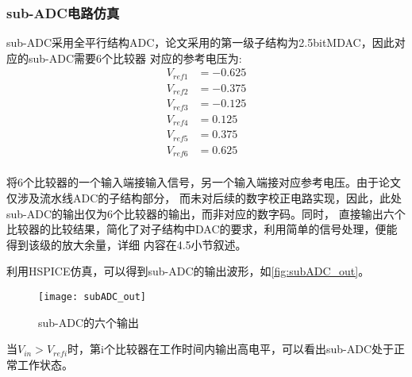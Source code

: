     \subsubsection{sub-ADC电路仿真}
    sub-ADC采用全平行结构ADC，论文采用的第一级子结构为2.5bitMDAC，因此对应的sub-ADC需要6个比较器
    对应的参考电压为:
    \begin{align*}
        V_{ref1} & = -0.625 \\
        V_{ref2} & = -0.375 \\
        V_{ref3} & = -0.125 \\
        V_{ref4} & = 0.125 \\
        V_{ref5} & = 0.375 \\
        V_{ref6} & = 0.625 \\
    \end{align*}
    \par 将6个比较器的一个输入端接输入信号，另一个输入端接对应参考电压。由于论文仅涉及流水线ADC的子结构部分，
    而未对后续的数字校正电路实现，因此，此处sub-ADC的输出仅为6个比较器的输出，而非对应的数字码。同时，
    直接输出六个比较器的比较结果，简化了对子结构中DAC的要求，利用简单的信号处理，便能得到该级的放大余量，详细
    内容在4.5小节叙述。
    \par 利用HSPICE仿真，可以得到sub-ADC的输出波形，如\autoref{fig:subADC_out}。
    \begin{figure}[H]
        \centering
        \texttt{[image: subADC\_out]}
        \caption{\label{fig:subADC_out}sub-ADC的六个输出}
    \end{figure}
    \par 当$ V_{in} > V_{refi} $时，第i个比较器在工作时间内输出高电平，可以看出sub-ADC处于正常工作状态。

